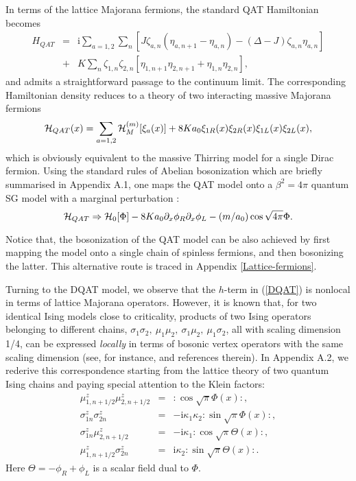 In terms of the lattice Majorana fermions, the standard QAT
Hamiltonian becomes
\begin{eqnarray}
H_{QAT}&=& \mbox{i} \sum\limits_{a=1,2}\sum\limits_n
\left[J\zeta_{a,n}(\eta_{a,n+1}-\eta_{a,n})- (\Delta -J)\zeta_{a,n}\eta_{a,n}\right]\nonumber\\
&+&
K\sum\limits_n\zeta_{1,n}\zeta_{2,n}\left[ \eta_{1,n+1}\eta_{2,n+1}+\eta_{1,n}\eta_{2,n}\right],
\label{QAT-M}
\end{eqnarray}
and admits a straightforward passage to
the continuum limit. The corresponding Hamiltonian density
reduces to a theory of two interacting massive Majorana fermions
\begin{equation}
{\cal{H}}_{QAT} (x) = \sum\limits_{a=1,2}{\cal{H}}^{(m)}_M [\xi_a (x)]+
8Ka_0\xi_{1R}(x)\xi_{2R}(x)\xi_{1L}(x)\xi_{2L}(x),
\label{Hds}
\end{equation}
which is obviously equivalent to the massive Thirring model for a single
Dirac fermion. Using the standard rules of Abelian bosonization
which are briefly summarised in Appendix A.1,
one maps the QAT model onto a $\beta^2 = 4\pi$ quantum SG model
with a marginal perturbation \cite{Coleman}:
\begin{equation}
{\cal{H}}_{QAT} \Rightarrow{\cal{H}}_0 [\Phi]
- 8 K a_0 \partial_x \phi_R \partial_x \phi_L
- (m/a_0) \cos \sqrt{4\pi} \Phi.
\label{QAT-SG+marg}
\end{equation}

Notice that, the bosonization of the QAT model can be also achieved by
first mapping the model onto a single chain of spinless fermions,
and then bosonizing the latter. This alternative route is traced
in Appendix \ref{Lattice-fermions}.

Turning to the DQAT model, we observe that the $h$-term in (\ref{DQAT})
is nonlocal in terms of lattice Majorana operators. However,
it is known that, for two identical Ising models close to criticality,
products of
two Ising operators belonging to different chains,
$\sigma_1 \sigma_2,~\mu_1 \mu_2,~ \sigma_1 \mu_2,~ \mu_1 \sigma_2$,
all with scaling
dimension 1/4, can be expressed {\sl locally} in terms of bosonic
vertex operators with the same scaling dimension (see, for instance, \cite{GNT}
and references therein).
In Appendix A.2, we rederive this correspondence
starting from the lattice theory of two quantum Ising chains
and paying special attention to the Klein factors:
\begin{eqnarray}
\mu^z _{1,n+1/2} \mu^z _{2,n+1/2} &=& :\cos \sqrt{\pi} \Phi(x):,
\label{mumu1}\\
\sigma^z _{1n} \sigma^z _{2n} &=&
- \mbox{i} \kappa_1 \kappa_2 :\sin \sqrt{\pi} \Phi (x):,
\label{ss1}\\
\sigma^z _{1n} \mu^z _{2,n+1/2} &=&
- \mbox{i} \kappa_1 :\cos \sqrt{\pi} \Theta(x):,
\label{smu1}\\
\mu^z _{1,n+1/2} \sigma^z _{2n} &=&
\mbox{i} \kappa_2 :\sin \sqrt{\pi} \Theta(x):.
\label{mus1}
\end{eqnarray}
Here $\Theta = - \phi_R + \phi_L$ is a scalar field dual to $\Phi$.


